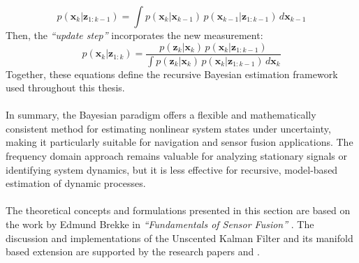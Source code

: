$$
    p(\mathbf{x}_k | \mathbf{z}_{1:k-1}) = \int p(\mathbf{x}_k | \mathbf{x}_{k-1})\,p(\mathbf{x}_{k-1} | \mathbf{z}_{1:k-1})\,d\mathbf{x}_{k-1}
$$
Then, the \textit{``update step''} incorporates the new measurement:
$$
    p(\mathbf{x}_k | \mathbf{z}_{1:k}) =
    \frac{p(\mathbf{z}_k | \mathbf{x}_k)\,p(\mathbf{x}_k | \mathbf{z}_{1:k-1})}
    {\int p(\mathbf{z}_k | \mathbf{x}_k)\,p(\mathbf{x}_k | \mathbf{z}_{1:k-1})\,d\mathbf{x}_k}
$$
Together, these equations define the recursive Bayesian estimation framework used throughout this thesis.
\\ \\
In summary, the Bayesian paradigm offers a flexible and mathematically consistent method for estimating nonlinear system states under uncertainty, making it particularly suitable for navigation and sensor fusion applications. The frequency domain approach remains valuable for analyzing stationary signals or identifying system dynamics, but it is less effective for recursive, model-based estimation of dynamic processes.  
\\ \\
The theoretical concepts and formulations presented in this section are based on the work by Edmund Brekke in \textit{``Fundamentals of Sensor Fusion''} \cite{sensor_fusion_book}. The discussion and implementations of the Unscented Kalman Filter and its manifold based extension are supported by the research papers \cite{ukf} and \cite{ukf_manifold}.



